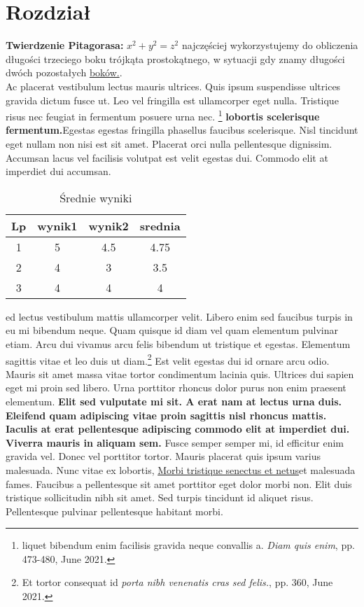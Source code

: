 \documentclass[12pt,a4paper]{article}
\begin{document}
	\section{Rozdział}
	\textbf{Twierdzenie Pitagorasa:} \(x^2 + y^2 = z^2\) najczęściej wykorzystujemy do obliczenia długości trzeciego boku trójkąta prostokątnego, w sytuacji gdy znamy długości dwóch pozostałych \underline{boków.}.
	\\Ac placerat vestibulum lectus mauris ultrices. Quis ipsum suspendisse ultrices gravida dictum fusce ut. Leo vel fringilla est ullamcorper eget nulla. Tristique risus nec feugiat in fermentum posuere urna nec. \footnote{liquet bibendum enim facilisis gravida neque convallis a. \emph{Diam quis enim}, pp. 473-480, June 2021.} \textbf{lobortis scelerisque fermentum.}Egestas egestas fringilla phasellus faucibus scelerisque. Nisl tincidunt eget nullam non nisi est sit amet. Placerat orci nulla pellentesque dignissim. Accumsan lacus vel facilisis volutpat est velit egestas dui. Commodo elit at imperdiet dui accumsan.
	\begin{table}[H]
		\centering
		\begin{tabular}{||c c c c||} 
			\hline
			Lp & wynik1 & wynik2 & srednia \\ [0.5ex] 
			\hline\hline
			1 & 5 & 4.5 & 4.75 \\ 
			\hline
			2 & 4 & 3 & 3.5 \\
			\hline
			3 & 4 & 4 & 4 \\ [1ex] 
			\hline
		\end{tabular}
	\caption{Średnie wyniki}
	\label{table: SrednieWyniki}
	\end{table}
	ed lectus vestibulum mattis ullamcorper velit. Libero enim sed faucibus turpis in eu mi bibendum neque. Quam quisque id diam vel quam elementum pulvinar etiam. Arcu dui vivamus arcu felis bibendum ut tristique et egestas. Elementum sagittis vitae et leo duis ut diam.\footnote{Et tortor consequat id \emph{porta nibh venenatis cras sed felis.}, pp. 360, June 2021.} Est velit egestas dui id ornare arcu odio. Mauris sit amet massa vitae tortor condimentum lacinia quis. Ultrices dui sapien eget mi proin sed libero. Urna porttitor rhoncus dolor purus non enim praesent elementum.  \textbf{Elit sed vulputate mi sit. A erat nam at lectus urna duis. Eleifend quam adipiscing vitae proin sagittis nisl rhoncus mattis. Iaculis at erat pellentesque adipiscing commodo elit at imperdiet dui. Viverra mauris in aliquam sem. } Fusce semper semper mi, id efficitur enim gravida vel. Donec vel porttitor tortor. Mauris placerat quis ipsum varius malesuada. Nunc vitae ex lobortis, \underline{Morbi tristique senectus et netus}et malesuada fames. Faucibus a pellentesque sit amet porttitor eget dolor morbi non. Elit duis tristique sollicitudin nibh sit amet. Sed turpis tincidunt id aliquet risus. Pellentesque pulvinar pellentesque habitant morbi.
\end{document}
